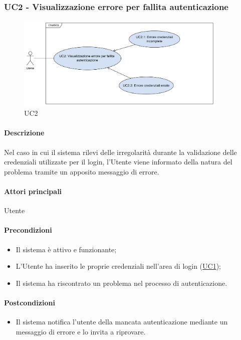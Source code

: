 \subsubsection{UC2 - Visualizzazione errore per fallita autenticazione}\label{UC2}

\begin{figure}[H]
  \centering
  \includegraphics[width=0.90\textwidth]{assets/uc2.png}
  \caption{UC2}
\end{figure}

\paragraph*{Descrizione}
Nel caso in cui il sistema rilevi delle irregolarità durante la validazione delle credenziali utilizzate per il login, l'Utente viene informato della natura del problema tramite un apposito messaggio di errore.

\paragraph*{Attori principali}
Utente

\paragraph*{Precondizioni}
\begin{itemize}
  \item Il sistema è attivo e funzionante;
  \item L'Utente ha inserito le proprie credenziali nell'area di login (\hyperref[UC1]{UC1});
  \item Il sistema ha riscontrato un problema nel processo di autenticazione.  
\end{itemize}

\paragraph*{Postcondizioni}
\begin{itemize}
  \item Il sistema notifica l'utente della mancata autenticazione mediante un messaggio di errore e lo invita a riprovare.
\end{itemize}

